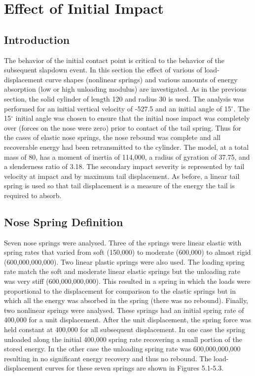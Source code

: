 \chapter{Effect of Initial Impact}

\section{Introduction}

     The behavior of the initial contact point is critical to the
behavior of the subsequent slapdown event.  In this section the effect
of various of load-displacement curve shapes (nonlinear springs) and
various amounts of energy absorption (low or high unloading modulus)
are investigated.  As in the previous section, the solid cylinder of
length 120 and radius 30 is used.  The analysis was performed for an
initial vertical velocity of -527.5 and an initial angle of 15$^\circ$.
The 15$^\circ$ initial angle was chosen to ensure that the initial nose
impact was completely over (forces on the nose were zero) prior to
contact of the tail spring.  Thus for the cases of elastic nose
springs, the nose rebound was complete and all recoverable energy
had been retransmitted to the cylinder. The model, at a total mass of
80, has a moment of inertia of 114,000, a radius of gyration of 37.75,
and a slenderness ratio of 3.18. The secondary impact severity is
represented by tail velocity at impact and by maximum tail
displacement.  As before, a linear tail spring is used so that tail
displacement is a measure of the energy the tail is required to
absorb. 

\section{Nose Spring Definition}

     Seven nose springs were analysed.  Three of the springs were
linear elastic with spring rates that varied from soft (150,000) to
moderate (600,000) to almost rigid (600,000,000,000).  Two linear
plastic springs were also used.  The loading spring rate match the
soft and moderate linear elastic springs but the unloading rate was
very stiff (600,000,000,000).  This resulted in a spring in which the
loads were proportional to the displacement for comparison to the
elastic springs but in which all the energy was absorbed in the spring
(there was no rebound).  Finally, two nonlinear springs were analysed.
These springs had an initial spring rate of 400,000 for a unit
displacement.  After the unit displacement, the spring force was held
constant at 400,000 for all subsequent displacement.  In one case the
spring unloaded along the initial 400,000 spring rate recovering a
small portion of the stored energy.  In the other case the unloading
spring rate was 600,000,000,000 resulting in no significant energy
recovery and thus no rebound.  The load-displacement curves for these
seven springs are shown in Figures 5.1-5.3.

